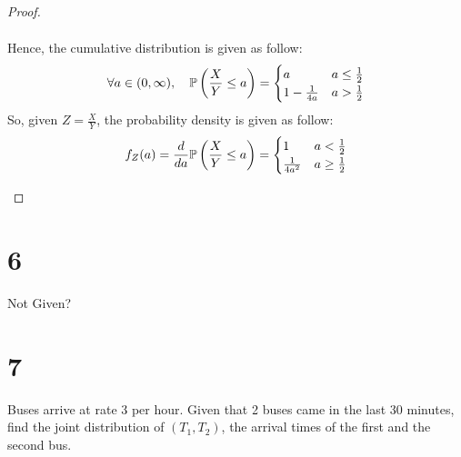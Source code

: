 \documentclass{article}
\begin{document}
\begin{proof}
\begin{itemize}
\begin{align}
        \end{align}
        Hence, the cumulative distribution is given as follow:
        \begin{align}
            \forall a\in(0,\infty),\quad \mathbb{P}\left(\frac{X}{Y}\leq a\right)=\begin{cases}
                a & a\leq \frac{1}{2}\\
                1-\frac{1}{4a} & a>\frac{1}{2}
            \end{cases}
        \end{align}
        So, given $Z=\frac{X}{Y}$, the probability density is given as follow:
        \begin{align}
            f_Z(a) = \frac{d}{da}\mathbb{P}\left(\frac{X}{Y}\leq a\right) = \begin{cases}
                1 & a<\frac{1}{2}\\
                \frac{1}{4a^2} & a\geq\frac{1}{2}
            \end{cases}
        \end{align}
    \end{itemize}
\end{proof}

\newpage

\section*{6}
\begin{ques}
    Not Given?
\end{ques}


\newpage

\section*{7}
\begin{ques}\label{q6}
    Buses arrive at rate 3 per hour. Given that 2 buses came in the last 30 minutes, find the joint distribution of $(T_1,T_2)$, the arrival times of the first and the second bus.
\end{ques}
\end{document}
